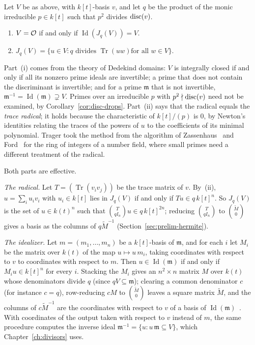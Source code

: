 \begin{theorem}[Trager]\label{thm:trager-criterion}
Let $V$ be as above, with $k[t]$-basis $v$, and let $q$ be the product of the
monic irreducible $p \in k[t]$ such that $p^2$ divides $\operatorname{disc}(v)$.
\begin{enumerate}[label=\textup{(\roman*)}]
\item $V = \mathcal{O}$ if and only if $\operatorname{Id}(J_q(V)) = V$.
\item $J_q(V) = \{ u \in V : q \text{ divides } \operatorname{Tr}(u w) \text{
  for all } w \in V \}$.
\end{enumerate}
\end{theorem}

Part~(i) comes from the theory of Dedekind domains: $V$ is integrally closed
if and only if all its nonzero prime ideals are invertible; a prime that
does not contain the discriminant is invertible; and for a prime $\mathfrak
m$ that is not invertible, $\mathfrak m^{-1} = \operatorname{Id}(\mathfrak m)
\supsetneq V$. Primes over an irreducible $p$ with $p^2 \nmid \operatorname{disc}(v)$ need
not be examined, by Corollary~\ref{cor:disc-drops}. Part~(ii) says that the
radical equals the \emph{trace radical}; it holds because the characteristic
of $k[t]/(p)$ is $0$, by Newton's identities relating the traces of the
powers of $u$ to the coefficients of its minimal polynomial. Trager took the
method from the algorithm of Zassenhaus~\cite{zassenhaus1972} and
Ford~\cite{ford1978} for the ring of integers of a number field, where small
primes need a different treatment of the radical.

Both parts are effective.

\emph{The radical.} Let $T = (\operatorname{Tr}(v_i v_j))$ be the trace
matrix of $v$. By~(ii), $u = \sum_i u_i v_i$ with $u_i \in k[t]$ lies in
$J_q(V)$ if and only if $T u \in q\, k[t]^n$. So $J_q(V)$ is the set of $u \in
k(t)^n$ such that $\binom{T}{q I_n} u \in q\, k[t]^{2n}$; reducing
$\binom{T}{q I_n}$ to $\binom{\tilde M}{0}$ gives a basis as the columns of
$q \tilde M^{-1}$ (Section~\ref{sec:prelim-hermite}).

\emph{The idealizer.} Let $m = (m_1, \dots, m_n)$ be a $k[t]$-basis of
$\mathfrak m$, and for each $i$ let $M_i$ be the matrix over $k(t)$ of the
map $u \mapsto u\, m_i$, taking coordinates with respect to $v$ to
coordinates with respect to $m$. Then $u \in \operatorname{Id}(\mathfrak m)$
if and only if $M_i u \in k[t]^n$ for every $i$. Stacking the $M_i$ gives an
$n^2 \times n$ matrix $M$ over $k(t)$ whose denominators divide $q$ (since
$q V \subseteq \mathfrak m$); clearing a common denominator $c$ (for instance
$c = q$), row-reducing $c M$ to $\binom{\tilde M}{0}$ leaves a square matrix
$\tilde M$, and the columns of $c \tilde M^{-1}$ are the coordinates with
respect to $v$ of a basis of $\operatorname{Id}(\mathfrak m)$~\cite[\S2.2]{trager1984}. With
coordinates of the output taken with respect to $v$ instead of $m$, the same
procedure computes the inverse ideal $\mathfrak m^{-1} = \{ u : u\, \mathfrak
m \subseteq V \}$, which Chapter~\ref{ch:divisors} uses.

